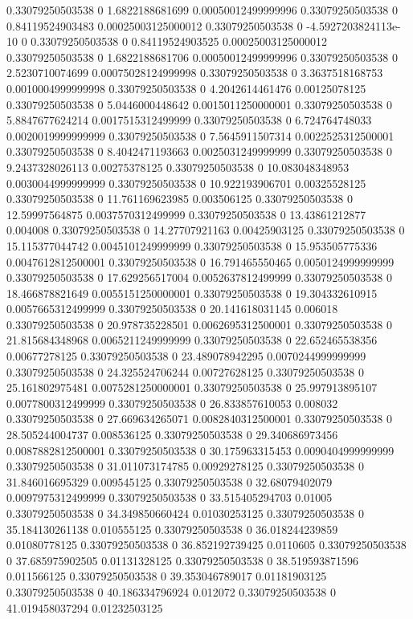 0.33079250503538 0 1.6822188681699 0.00050012499999996
0.33079250503538 0 0.84119524903483 0.00025003125000012
0.33079250503538 0 -4.5927203824113e-10 0
0.33079250503538 0 0.84119524903525 0.00025003125000012
0.33079250503538 0 1.6822188681706 0.00050012499999996
0.33079250503538 0 2.5230710074699 0.00075028124999998
0.33079250503538 0 3.3637518168753 0.0010004999999998
0.33079250503538 0 4.2042614461476 0.00125078125
0.33079250503538 0 5.0446000448642 0.0015011250000001
0.33079250503538 0 5.8847677624214 0.0017515312499999
0.33079250503538 0 6.724764748033 0.0020019999999999
0.33079250503538 0 7.5645911507314 0.0022525312500001
0.33079250503538 0 8.4042471193663 0.0025031249999999
0.33079250503538 0 9.2437328026113 0.00275378125
0.33079250503538 0 10.083048348953 0.0030044999999999
0.33079250503538 0 10.922193906701 0.00325528125
0.33079250503538 0 11.761169623985 0.003506125
0.33079250503538 0 12.59997564875 0.0037570312499999
0.33079250503538 0 13.43861212877 0.004008
0.33079250503538 0 14.27707921163 0.00425903125
0.33079250503538 0 15.115377044742 0.0045101249999999
0.33079250503538 0 15.953505775336 0.0047612812500001
0.33079250503538 0 16.791465550465 0.0050124999999999
0.33079250503538 0 17.629256517004 0.0052637812499999
0.33079250503538 0 18.466878821649 0.0055151250000001
0.33079250503538 0 19.304332610915 0.0057665312499999
0.33079250503538 0 20.141618031145 0.006018
0.33079250503538 0 20.978735228501 0.0062695312500001
0.33079250503538 0 21.815684348968 0.0065211249999999
0.33079250503538 0 22.652465538356 0.00677278125
0.33079250503538 0 23.489078942295 0.0070244999999999
0.33079250503538 0 24.325524706244 0.00727628125
0.33079250503538 0 25.161802975481 0.0075281250000001
0.33079250503538 0 25.997913895107 0.0077800312499999
0.33079250503538 0 26.833857610053 0.008032
0.33079250503538 0 27.669634265071 0.0082840312500001
0.33079250503538 0 28.505244004737 0.008536125
0.33079250503538 0 29.340686973456 0.0087882812500001
0.33079250503538 0 30.175963315453 0.0090404999999999
0.33079250503538 0 31.011073174785 0.00929278125
0.33079250503538 0 31.846016695329 0.009545125
0.33079250503538 0 32.68079402079 0.0097975312499999
0.33079250503538 0 33.515405294703 0.01005
0.33079250503538 0 34.349850660424 0.01030253125
0.33079250503538 0 35.184130261138 0.010555125
0.33079250503538 0 36.018244239859 0.01080778125
0.33079250503538 0 36.852192739425 0.0110605
0.33079250503538 0 37.685975902505 0.01131328125
0.33079250503538 0 38.519593871596 0.011566125
0.33079250503538 0 39.353046789017 0.01181903125
0.33079250503538 0 40.186334796924 0.012072
0.33079250503538 0 41.019458037294 0.01232503125
